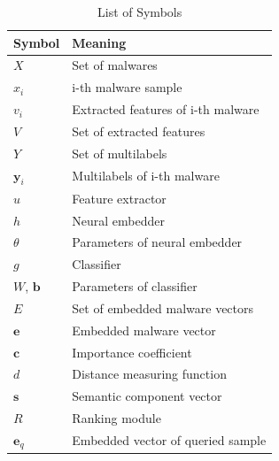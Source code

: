 \begin{table}[!htb] %
\caption{List of Symbols}
\label{tab:notation}
\begin{minipage}{\columnwidth}
\begin{center}
\begin{tabular}{ll}
\toprule
Symbol & Meaning\\
\midrule
  $X$ & Set of malwares \\
  $x_i$ & i-th malware sample \\
  $v_i$ & Extracted features of i-th malware\\
  $V$ & Set of extracted features \\
  $Y$ & Set of multilabels  \\
  $\mathbf{y}_{i}$ & Multilabels of i-th malware\\
  $u$ & Feature extractor \\
  $h$ & Neural embedder \\
  $\theta$ & Parameters of neural embedder \\
  $g$ & Classifier \\   
  $W$, $\mathbf{b}$ & Parameters of classifier \\  
  $E$ & Set of embedded malware vectors \\
  $\mathbf{e}$ & Embedded malware vector \\
  $\mathbf{c}$ & Importance coefficient \\
  $d$ & Distance measuring function \\
  $\mathbf{s}$ & Semantic component vector \\
  $R$ & Ranking module \\
  $\mathbf{e}_q$ & Embedded vector of queried sample \\
  
\bottomrule
\end{tabular}
\end{center}
\bigskip\centering
\end{minipage}
\end{table}


